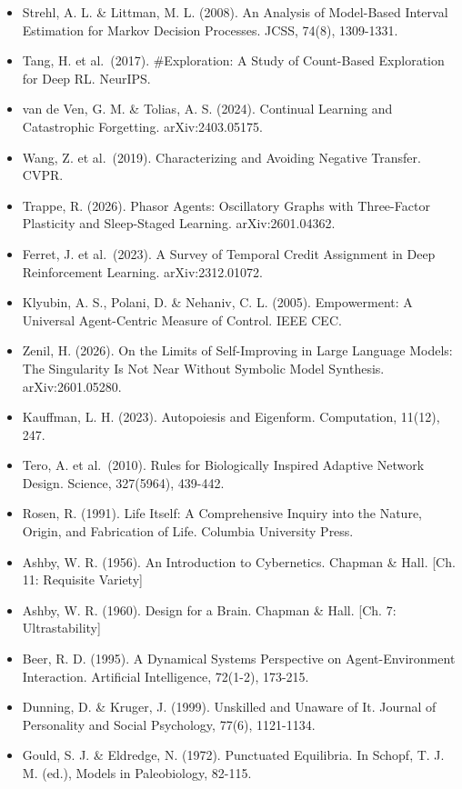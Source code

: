 \documentclass[
  11pt,
]{article}
\begin{document}
\begin{itemize}
\item
  Strehl, A. L. \& Littman, M. L. (2008). An Analysis of Model-Based
  Interval Estimation for Markov Decision Processes. JCSS, 74(8),
  1309-1331.
\item
  Tang, H. et al.~(2017). \#Exploration: A Study of Count-Based
  Exploration for Deep RL. NeurIPS.
\item
  van de Ven, G. M. \& Tolias, A. S. (2024). Continual Learning and
  Catastrophic Forgetting. arXiv:2403.05175.
\item
  Wang, Z. et al.~(2019). Characterizing and Avoiding Negative Transfer.
  CVPR.
\item
  Trappe, R. (2026). Phasor Agents: Oscillatory Graphs with Three-Factor
  Plasticity and Sleep-Staged Learning. arXiv:2601.04362.
\item
  Ferret, J. et al.~(2023). A Survey of Temporal Credit Assignment in
  Deep Reinforcement Learning. arXiv:2312.01072.
\item
  Klyubin, A. S., Polani, D. \& Nehaniv, C. L. (2005). Empowerment: A
  Universal Agent-Centric Measure of Control. IEEE CEC.
\item
  Zenil, H. (2026). On the Limits of Self-Improving in Large Language
  Models: The Singularity Is Not Near Without Symbolic Model Synthesis.
  arXiv:2601.05280.
\item
  Kauffman, L. H. (2023). Autopoiesis and Eigenform. Computation,
  11(12), 247.
\item
  Tero, A. et al.~(2010). Rules for Biologically Inspired Adaptive
  Network Design. Science, 327(5964), 439-442.
\item
  Rosen, R. (1991). Life Itself: A Comprehensive Inquiry into the
  Nature, Origin, and Fabrication of Life. Columbia University Press.
\item
  Ashby, W. R. (1956). An Introduction to Cybernetics. Chapman \& Hall.
  {[}Ch. 11: Requisite Variety{]}
\item
  Ashby, W. R. (1960). Design for a Brain. Chapman \& Hall. {[}Ch. 7:
  Ultrastability{]}
\item
  Beer, R. D. (1995). A Dynamical Systems Perspective on
  Agent-Environment Interaction. Artificial Intelligence, 72(1-2),
  173-215.
\item
  Dunning, D. \& Kruger, J. (1999). Unskilled and Unaware of It. Journal
  of Personality and Social Psychology, 77(6), 1121-1134.
\item
  Gould, S. J. \& Eldredge, N. (1972). Punctuated Equilibria. In Schopf,
  T. J. M. (ed.), Models in Paleobiology, 82-115.

\end{itemize}
\end{document}
